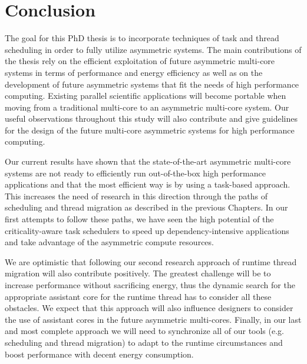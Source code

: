 \chapter{Conclusion}

The goal for this PhD thesis is to incorporate techniques of task and thread scheduling in order to fully utilize asymmetric systems.
The main contributions of the thesis rely on the efficient exploitation of future asymmetric multi-core systems in terms of performance and energy efficiency as well as on the development of future asymmetric systems that fit the needs of high performance computing.
Existing parallel scientific applications will become portable when moving from a traditional multi-core to an asymmetric multi-core system. 
Our useful observations throughout this study will also contribute and give guidelines for the design of the future multi-core asymmetric systems for high performance computing.



Our current results have shown that the state-of-the-art asymmetric multi-core systems are not ready to efficiently run out-of-the-box high performance applications and that the most efficient way is by using a task-based approach.
This increases the need of research in this direction through the paths of scheduling and thread migration as described in the previous Chapters.
In our first attempts to follow these paths, we have seen the high potential of the criticality-aware task schedulers to speed up dependency-intensive applications and take advantage of the asymmetric compute resources.

We are optimistic that following our second research approach of runtime thread migration will also contribute positively.
The greatest challenge will be to increase performance without sacrificing energy, thus the dynamic search for the appropriate assistant core for the runtime thread has to consider all these obstacles.
We expect that this approach will also influence designers to consider the use of assistant cores in the future asymmetric multi-cores.
Finally, in our last and most complete approach we will need to synchronize all of our tools (e.g. scheduling and thread migration) to adapt to the runtime circumstances and boost performance with decent energy consumption.

